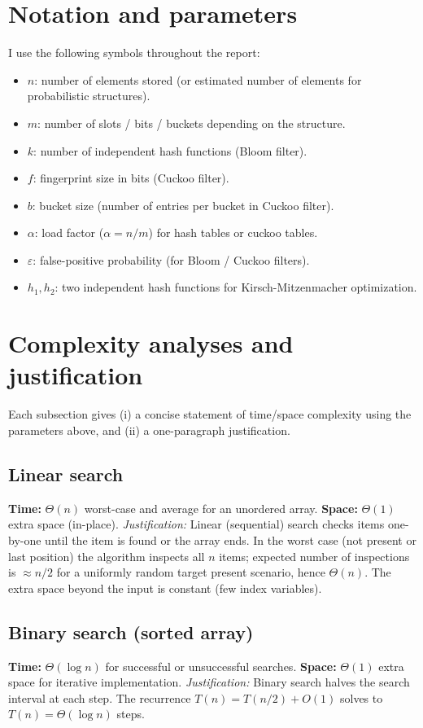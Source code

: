 \documentclass[sigconf]{acmart}
\begin{document}
\section{Notation and parameters}
I use the following symbols throughout the report:
\begin{itemize}
\item $n$: number of elements stored (or estimated number of elements for probabilistic structures).
\item $m$: number of slots / bits / buckets depending on the structure.
\item $k$: number of independent hash functions (Bloom filter).
\item $f$: fingerprint size in bits (Cuckoo filter).
\item $b$: bucket size (number of entries per bucket in Cuckoo filter).
\item $\alpha$: load factor ($\alpha = n/m$) for hash tables or cuckoo tables.
\item $\varepsilon$: false-positive probability (for Bloom / Cuckoo filters).
\item $h_1, h_2$: two independent hash functions for Kirsch-Mitzenmacher optimization.
\end{itemize}

\section{Complexity analyses and justification}
Each subsection gives (i) a concise statement of time/space complexity using the parameters above, and (ii) a one-paragraph justification.

\subsection{Linear search}
\textbf{Time:} $\Theta(n)$ worst-case and average for an unordered array.\newline
\textbf{Space:} $\Theta(1)$ extra space (in-place).\newline
\textit{Justification:} Linear (sequential) search checks items one-by-one until the item is found or the array ends. In the worst case (not present or last position) the algorithm inspects all $n$ items; expected number of inspections is $\approx n/2$ for a uniformly random target present scenario, hence $\Theta(n)$. The extra space beyond the input is constant (few index variables).

\subsection{Binary search (sorted array)}
\textbf{Time:} $\Theta(\log n)$ for successful or unsuccessful searches.\newline
\textbf{Space:} $\Theta(1)$ extra space for iterative implementation.\newline
\textit{Justification:} Binary search halves the search interval at each step. The recurrence $T(n)=T(n/2)+O(1)$ solves to $T(n)=\Theta(\log n)$ steps.
\end{document}
